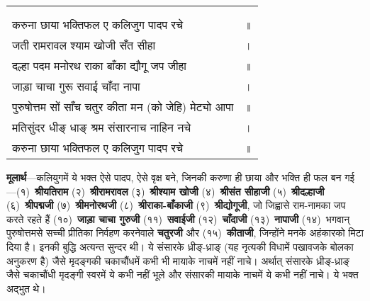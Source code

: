 
{
{\bfseries
\setlength{\mylenone}{0pt}
\settowidth{\mylentwo}{}
\setlength{\mylenone}{\maxof{\mylenone}{\mylentwo}}
\settowidth{\mylentwo}{करुना छाया भक्तिफल ए कलिजुग पादप रचे}
\setlength{\mylenone}{\maxof{\mylenone}{\mylentwo}}
\settowidth{\mylentwo}{जती रामरावल श्याम खोजी सँत सीहा}
\setlength{\mylenone}{\maxof{\mylenone}{\mylentwo}}
\settowidth{\mylentwo}{दल्हा पदम मनोरथ राका बाँका द्यौगू जप जीहा}
\setlength{\mylenone}{\maxof{\mylenone}{\mylentwo}}
\settowidth{\mylentwo}{जाड़ा चाचा गुरू सवाई चाँदा नापा}
\setlength{\mylenone}{\maxof{\mylenone}{\mylentwo}}
\settowidth{\mylentwo}{पुरुषोत्तम सों साँच चतुर कीता मन (को जेहि) मेट्यो आपा}
\setlength{\mylenone}{\maxof{\mylenone}{\mylentwo}}
\settowidth{\mylentwo}{मतिसुंदर धीङ् धाङ् श्रम संसारनाच नाहिन नचे}
\setlength{\mylenone}{\maxof{\mylenone}{\mylentwo}}
\settowidth{\mylentwo}{करुना छाया भक्तिफल ए कलिजुग पादप रचे}
\setlength{\mylenone}{\maxof{\mylenone}{\mylentwo}}
\setlength{\mylentwo}{\baselineskip}
\setlength{\mylenone}{\mylenone + 1pt}
\begin{longtable}[l]{@{\hspace*{\mylen}}>{\setlength\parfillskip{0pt}}p{\mylenone}@{}@{}l@{}}
 & \\[-\the\mylentwo]
\centering{॥ ९७ \hspace*{-1.5mm}॥} & \\ \nopagebreak
करुना छाया भक्तिफल ए कलिजुग पादप रचे & ॥\\
जती रामरावल श्याम खोजी सँत सीहा & ।\\ \nopagebreak
दल्हा पदम मनोरथ राका बाँका द्यौगू जप जीहा & ॥\\
जाड़ा चाचा गुरू सवाई चाँदा नापा & ।\\ \nopagebreak
पुरुषोत्तम सों साँच चतुर कीता मन (को जेहि) मेट्यो आपा & ॥\\
मतिसुंदर धीङ् धाङ् श्रम संसारनाच नाहिन नचे & ।\\ \nopagebreak
करुना छाया भक्तिफल ए कलिजुग पादप रचे & ॥
\end{longtable}
}
}
\begin{sloppypar}\justifying{}
\textbf{मूलार्थ}—कलियुगमें ये भक्त ऐसे पादप, ऐसे वृक्ष बने, जिनकी करुणा ही छाया और भक्ति ही फल बन गई—(१)~\textbf{श्रीयतिराम} (२)~\textbf{श्रीरामरावल} (३)~\textbf{श्रीश्याम खोजी} (४)~\textbf{श्रीसंत सीहाजी} (५)~\textbf{श्रीदल्हाजी} (६)~\textbf{श्रीपद्मजी} (७)~\textbf{श्रीमनोरथजी} (८)~\textbf{श्रीराका-बाँकाजी} (९)~\textbf{श्रीद्योगूजी}, जो जिह्वासे राम-नामका जप करते रहते हैं (१०)~\textbf{जाड़ा चाचा गुरुजी} (११)~\textbf{सवाईजी} (१२)~\textbf{चाँदाजी} (१३)~\textbf{नापाजी} (१४)~भगवान् पुरुषोत्तमसे सच्ची प्रीतिका निर्वहण करनेवाले \textbf{चतुरजी} और (१५)~\textbf{कीताजी}, जिन्होंने मनके अहंकारको मिटा दिया है। इनकी बुद्धि अत्यन्त सुन्दर थी। ये संसारके ध्रीङ्-ध्राङ् (यह नृत्यकी विधामें पखावजके बोलका अनुकरण है) जैसे मृदङ्गकी चकाचौंधमें कभी भी मायाके नाचमें नहीं नाचे। अर्थात् संसारके ध्रीङ्-ध्राङ् जैसे चकाचौंधी मृदङ्गी स्वरमें ये कभी नहीं भूले और संसारकी मायाके नाचमें ये कभी नहीं नाचे। ये भक्त अद्भुत थे।
\end{sloppypar}

